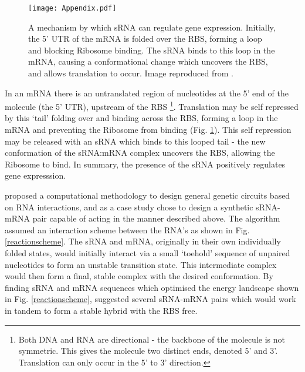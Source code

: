 \documentclass[10pt,journal]{./IEEE_latex_class/IEEEtran}
\begin{document}
\begin{figure}[H]
\centering
\texttt{[image: Appendix.pdf]}
\caption{A mechanism by which sRNA can regulate gene expression. Initially, the 5' UTR of the mRNA is folded over the RBS, forming a loop and blocking Ribosome binding. The sRNA binds to this loop in the mRNA, causing a conformational change which uncovers the RBS, and allows translation to occur. Image reproduced from \cite{Rodrigo2012}.}
\label{RBS}
\end{figure}
\setcounter{figure}{2}

In an mRNA there is an untranslated region of nucleotides at the 5' end of the molecule (the 5' UTR), upstream of the RBS \footnote{Both DNA and RNA are directional - the backbone of the molecule is not symmetric. This gives the molecule two distinct ends, denoted 5' and 3'. Translation can only occur in the 5' to 3' direction.}. Translation may be self repressed by this `tail' folding over and binding across the RBS, forming a  loop in the mRNA and preventing the Ribosome from binding (Fig. \ref{RBS}). This self repression may be released with an sRNA which binds to this looped tail - the new conformation of the sRNA:mRNA complex uncovers the RBS, allowing the Ribosome to bind. In summary, the presence of the sRNA positively regulates gene expresssion.


\cite{Rodrigo2012} proposed a computational methodology to design general genetic circuits based on RNA interactions, and as a case study chose to design a synthetic sRNA- mRNA pair capable of acting in the manner described above. The algorithm assumed an interaction scheme between the RNA's as shown in Fig. \ref{reactionscheme}. The sRNA and mRNA, originally in their own individually folded states, would initially interact via a small 
`toehold' sequence of unpaired nucleotides to form an unstable transition state. This intermediate complex would then form a final, stable complex with the desired conformation. By finding sRNA and mRNA sequences which optimised the energy landscape shown in Fig. \ref{reactionscheme}, \cite{Rodrigo2012} suggested several sRNA-mRNA pairs which would work in tandem to form a stable hybrid with the RBS free. 
\end{document}
